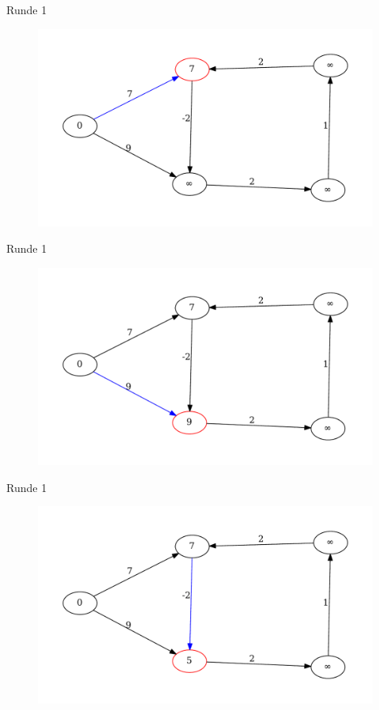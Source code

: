 \begin{frame}{Runde 1}
\begin{figure}[htbp]
\centering
\includegraphics[width=\linewidth]{bellman_ford_graphs/graph_01.pdf}
\end{figure}
\end{frame}


\begin{frame}{Runde 1}
\begin{figure}[htbp]
\centering
\includegraphics[width=\linewidth]{bellman_ford_graphs/graph_02.pdf}
\end{figure}
\end{frame}

\begin{frame}{Runde 1}
\begin{figure}[htbp]
\centering
\includegraphics[width=\linewidth]{bellman_ford_graphs/graph_03.pdf}
\end{figure}
\end{frame}


